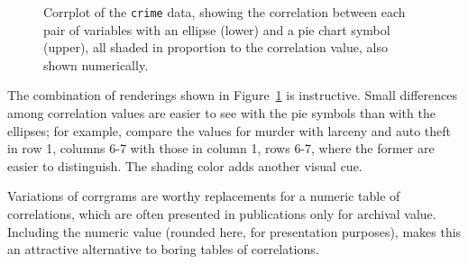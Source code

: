 \documentclass[
  letterpaper,
  10pt,
  krantz2]{krantz}
\begin{document}
\begin{figure}[H]


\caption{\label{fig-crime-corrplot}Corrplot of the \texttt{crime} data,
showing the correlation between each pair of variables with an ellipse
(lower) and a pie chart symbol (upper), all shaded in proportion to the
correlation value, also shown numerically.}

\end{figure}%

The combination of renderings shown in Figure~\ref{fig-crime-corrplot}
is instructive. Small differences among correlation values are easier to
see with the pie symbols than with the ellipses; for example, compare
the values for murder with larceny and auto theft in row 1, columns 6-7
with those in column 1, rows 6-7, where the former are easier to
distinguish. The shading color adds another visual cue.

Variations of corrgrams are worthy replacements for a numeric table of
correlations, which are often presented in publications only for
archival value. Including the numeric value (rounded here, for
presentation purposes), makes this an attractive alternative to boring
tables of correlations.
\end{document}
